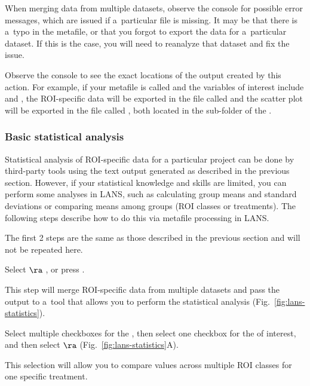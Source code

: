 \bul When merging data from multiple datasets, observe the console for possible error messages, which are issued if a~particular file is missing. It may be that there is a~typo in the metafile, or that you forgot to export the data for a~particular dataset. If this is the case, you will need to reanalyze that dataset and fix the issue.

\bul Observe the console to see the exact locations of the output created by this action. For example, if your metafile is called  and the variables of interest include  and , the ROI-specific data will be exported in the file called  and the scatter plot will be exported in the file called , both located in the sub-folder  of the .


\subsubsection{Basic statistical analysis}

\goldbox{}
Statistical analysis of ROI-specific data for a particular project can be done by third-party tools using the text output generated as described in the previous section.  However, if your statistical knowledge and skills are limited, you can perform some  analyses in LANS, such as calculating group means and standard deviations or comparing means among groups (ROI classes or treatments). The following steps describe how to do this via metafile processing in LANS.
\tcbe

 The first 2 steps are the same as those described in the previous section and will not be repeated here.

\setcounter{step}{2}
\s Select  $\ra$ , or press .

\nb
\bul This step will merge ROI-specific data from multiple datasets and pass the output to a~tool that allows you to perform the statistical analysis (Fig.~\ref{fig:lans-statistics}).

\s Select multiple checkboxes for the , then select one checkbox for the  of interest,  and then select  $\ra$  (Fig.~\ref{fig:lans-statistics}A).

\nb
\bul This selection will allow you to compare values across multiple ROI classes for one specific treatment.

